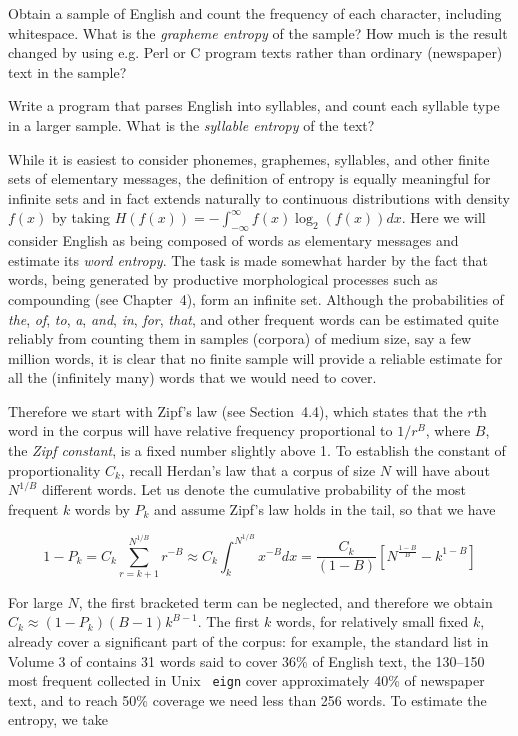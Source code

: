 \smallskip{} Obtain a sample of English
and count the frequency of each character, including whitespace. What is the
{\it grapheme entropy} of the sample?  How much is the result changed by using
e.g. Perl or C program texts rather than ordinary (newspaper) text in the
sample?

\smallskip{} Write a program that parses
English into syllables, and count each syllable type in a larger sample. What
is the {\it syllable entropy} of the text?

\smallskip\noindent While it is easiest to consider phonemes, graphemes,
syllables, and other finite sets of elementary messages, the definition of
entropy is equally meaningful for infinite sets and in fact extends naturally
to continuous distributions with density $f(x)$ by taking
$H(f(x))=-\int_{-\infty}^{\infty} f(x)\log_2(f(x))dx$. Here we will consider
English as being composed of words as elementary messages and estimate its
{\it word entropy}. The task is made somewhat harder by the fact that words,
being generated by productive morphological processes such as compounding (see
Chapter~4), form an infinite set. Although the probabilities of {\it the},
{\it of}, {\it to}, {\it a}, {\it and}, {\it in}, {\it for}, {\it that}, and
other frequent words can be estimated quite reliably from counting them in
samples (corpora) of medium size, say a few million words, it is clear that no
finite sample will provide a reliable estimate for all the (infinitely many)
words that we would need to cover.

Therefore we start with Zipf's law (see Section~4.4), which
states that the $r$th word in the corpus will have relative frequency
proportional to $1/r^B$, where $B$, the {\it Zipf constant}, is a fixed number
slightly above 1. To establish the constant of proportionality $C_k$, recall
Herdan's law that a corpus of size $N$ will have about $N^{1/B}$ different
words. Let us denote the cumulative probability of the most frequent $k$ words
by $P_k$ and assume Zipf's law holds in the tail, so that we have

\begin{equation}
1-P_k=C_k \sum_{r=k+1}^{N^{1/B}} r^{-B} \approx C_k \int_k^{N^{1/B}} x^{-B}dx 
= \frac{C_k}{(1-B)}[N^{\frac{1-B}{B}}-k^{1-B}]
\end{equation}

\smallskip\noindent
For large $N$, the first bracketed term can be neglected, and therefore we
obtain $C_k \approx (1-P_k)(B-1)k^{B-1}$. The first $k$ words, for relatively
small fixed $k$, already cover a significant part of the corpus: for example,
the standard list in Volume 3 of \cite{Knuth:1971} contains 31 words said to
cover 36\% of English text, the 130--150 most frequent collected in Unix {\tt
eign} cover approximately 40\% of newspaper text, and to reach 50\% coverage
we need less than 256 words.  To estimate the entropy, we take


